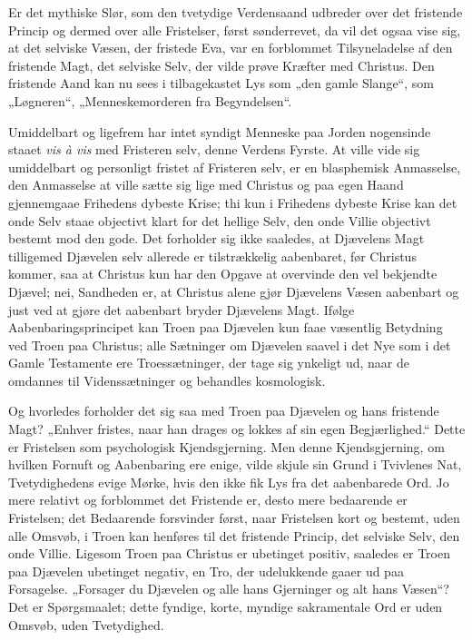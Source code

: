 \documentclass[12pt]{book}
\begin{document}
Er det mythiske Slør, som den tvetydige Verdensaand udbreder over
det fristende Princip og dermed over alle Fristelser, først
sønderrevet, da vil det ogsaa vise sig, at det selviske Væsen, der
fristede Eva, var en forblommet Tilsyneladelse af den fristende
Magt, det selviske Selv, der vilde prøve Kræfter med Christus. Den
fristende Aand kan nu sees i tilbagekastet Lys som „den gamle
Slange“, som „Løgneren“, „Menneskemorderen fra Begyndelsen“.

Umiddelbart og ligefrem har intet syndigt Menneske paa Jorden
nogensinde staaet \textit{vis à vis} med Fristeren selv, denne
Verdens Fyrste. At ville vide sig umiddelbart og personligt fristet
af Fristeren selv, er en blasphemisk Anmasselse, den Anmasselse at
ville sætte sig lige med Christus og paa egen Haand gjennemgaae
Frihedens dybeste Krise; thi kun i Frihedens dybeste Krise kan det
onde Selv staae objectivt klart for det hellige Selv, den onde
Villie objectivt bestemt mod den gode. Det forholder sig ikke
saaledes, at Djævelens Magt tilligemed Djævelen selv allerede er
tilstrækkelig aabenbaret,
før Christus kommer, saa at Christus kun har den Opgave at overvinde
den vel bekjendte Djævel; nei, Sandheden er, at Christus alene gjør
Djævelens Væsen aabenbart og just ved at gjøre det aabenbart bryder
Djævelens Magt. Ifølge Aabenbaringsprincipet kan Troen paa Djævelen
kun faae væsentlig Betydning ved Troen paa Christus; alle Sætninger
om Djævelen saavel i det Nye som i det Gamle Testamente ere
Troessætninger, der tage sig ynkeligt ud, naar de omdannes til
Videnssætninger og behandles kosmologisk.

Og hvorledes forholder det sig saa med Troen paa Djævelen og hans
fristende Magt? „Enhver fristes, naar han drages og lokkes af sin
egen Begjærlighed.“ Dette er Fristelsen som psychologisk
Kjendsgjerning. Men denne Kjendsgjerning, om hvilken Fornuft og
Aabenbaring ere enige, vilde skjule sin Grund i Tvivlenes Nat,
Tvetydighedens evige Mørke, hvis den ikke fik Lys fra det
aabenbarede Ord. Jo mere relativt og forblommet det Fristende er,
desto mere bedaarende er Fristelsen; det Bedaarende forsvinder
først, naar Fristelsen kort og bestemt, uden alle Omsvøb, i Troen
kan henføres til det fristende Princip, det selviske Selv, den onde
Villie. Ligesom Troen paa Christus er ubetinget positiv, saaledes er
Troen paa Djævelen ubetinget negativ, en Tro, der udelukkende gaaer
ud paa Forsagelse. „Forsager du Djævelen og alle hans Gjerninger og
alt hans Væsen“? Det er Spørgsmaalet; dette fyndige, korte, myndige
sakramentale Ord er uden Omsvøb, uden Tvetydighed.
\end{document}
